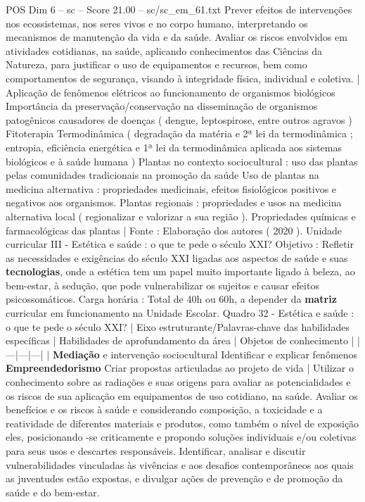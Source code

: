 \begin{textsample}{POS Dim 6 – sc – Score 21.00 – sc/sc\_em\_61.txt}
Prever efeitos de intervenções nos ecossistemas, nos seres vivos e no corpo humano, interpretando os mecanismos de manutenção da vida e da saúde.
Avaliar os riscos envolvidos em atividades cotidianas, na saúde, aplicando conhecimentos das Ciências da Natureza, para justificar o uso de equipamentos e recursos, bem como comportamentos de segurança, visando à integridade física, individual e coletiva. | Aplicação de fenômenos elétricos ao funcionamento de organismos biológicos Importância da preservação/conservação na disseminação de organismos patogênicos causadores de doenças ( dengue, leptospirose, entre outros agravos ) Fitoterapia Termodinâmica ( degradação da matéria e 2ª lei da termodinâmica ; entropia, eficiência energética e 1ª lei da termodinâmica aplicada aos sistemas biológicos e à saúde humana ) Plantas no contexto sociocultural : uso das plantas pelas comunidades tradicionais na promoção da saúde Uso de plantas na medicina alternativa : propriedades medicinais, efeitos fisiológicos positivos e negativos aos organismos.
Plantas regionais : propriedades e usos na medicina alternativa local ( regionalizar e valorizar a sua região ).
Propriedades químicas e farmacológicas das plantas | Fonte : Elaboração dos autores ( 2020 ).
Unidade curricular III - Estética e saúde : o que te pede o século XXI?
Objetivo : Refletir as necessidades e exigências do século XXI ligadas aos aspectos de saúde e suas \textbf{tecnologias}, onde a estética tem um papel muito importante ligado à beleza, ao bem-estar, à sedução, que pode vulnerabilizar os sujeitos e causar efeitos psicossomáticos.
Carga horária : Total de 40h ou 60h, a depender da \textbf{matriz} curricular em funcionamento na Unidade Escolar.
Quadro 32 - Estética e saúde : o que te pede o século XXI? | Eixo estruturante/Palavras-chave das habilidades específicas | Habilidades de aprofundamento da área | Objetos de conhecimento | |---|---|---| | \textbf{Mediação} e intervenção sociocultural Identificar e explicar fenômenos \textbf{Empreendedorismo} Criar propostas articuladas ao projeto de vida | Utilizar o conhecimento sobre as radiações e suas origens para avaliar as potencialidades e os riscos de sua aplicação em equipamentos de uso cotidiano, na saúde.
Avaliar os benefícios e os riscos à saúde e considerando composição, a toxicidade e a reatividade de diferentes materiais e produtos, como também o nível de exposição eles, posicionando -se criticamente e propondo soluções individuais e/ou coletivas para seus usos e descartes responsáveis.
Identificar, analisar e discutir vulnerabilidades vinculadas às vivências e aos desafios contemporâneos aos quais as juventudes estão expostas, e divulgar ações de prevenção e de promoção da saúde e do bem-estar.

\end{textsample}
